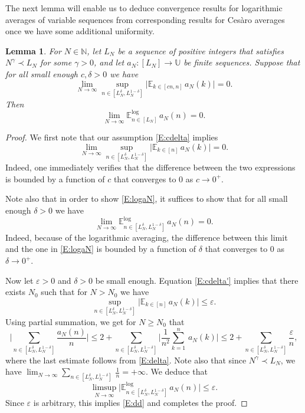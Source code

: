 \documentclass[11pt]{amsart}
\newtheorem{lemma}{Lemma}[section]
\theoremstyle{definition}
\newcommand{\lE}{\mathbb{E}^{\log}}
\newcommand{\E}{{\mathbb E}}
\newcommand{\N}{{\mathbb N}}
\newcommand{\U}{{\mathbb U}}
\begin{document}
 The next lemma will enable us to deduce convergence results for logarithmic averages
 of variable sequences from  corresponding results  for Ces\`aro averages once we have  some additional uniformity.
 \begin{lemma}\label{L:ceslogapp}
For $N\in \N$,  let   $L_N$ be a sequence of positive integers that satisfies  $N^\gamma\prec L_N$ for some $\gamma>0$, and let $a_N\colon [L_N]\to \U$ be  finite sequences.
 	 Suppose that
 	 for all small enough $c,\delta>0$ we have
  	 \begin{equation}\label{E:cdelta}
  	\lim_{N\to\infty} \sup_{n\in [L_N^\delta, L_N^{1-\delta}]}\big| \E_{k\in[cn,n]}\, a_N(k)\big|=0.
  \end{equation}
 	 Then
 	 \begin{equation}\label{E:logaN}
 	 \lim_{N\to\infty} \lE_{n\in[L_N]}\, a_N(n)=0.
 	 \end{equation}
 \end{lemma}
\begin{proof}
	We first note that our assumption  \eqref{E:cdelta}  implies
 \begin{equation}\label{E:cdelta'}
		\lim_{N\to\infty} \sup_{n\in [L_N^\delta, L_N^{1-\delta}]}\big| \E_{k\in[n]}\, a_N(k)\big|=0.
\end{equation}
	Indeed, one immediately verifies that  the difference between the two expressions is
	bounded by  a function of $c$  that  converges to $0$ as $c\to 0^+$.
	
	Note also that in order to show \eqref{E:logaN}, it suffices to show that for all small enough $\delta>0$ we have
	 \begin{equation}\label{E:dd}
	\lim_{N\to\infty} \lE_{n\in[L_N^\delta,L_N^{1-\delta}]}\, a_N(n)=0.
	\end{equation}
	Indeed, because of the logarithmic averaging, the difference between this limit  and the one in \eqref{E:logaN} is bounded by   a function of $\delta$ that converges to $0$ as $\delta\to 0^+$.  
	
	Now let   $ \varepsilon>0$ and $\delta>0$ be small enough. Equation  \eqref{E:cdelta'} implies that there exists $N_0$ such that for $N>N_0$ we have
	 \begin{equation}\label{E:delta}
		\sup_{n\in [L_N^\delta, L_N^{1-\delta}]}\big| \E_{k\in [n]}\, a_N(k)\big|\leq \varepsilon.
	\end{equation}
Using partial summation, we get  for $N\geq N_0$ that
$$
\Big|\sum_{n\in [L_N^\delta,L_N^{1-\delta}]} \frac{a_N(n)}{n} \Big|\leq 2+ \sum_{n\in [L_N^\delta,L_N^{1-\delta}]}\Big| \frac{1}{n^2}\sum_{k=1}^n\, a_N(k)\Big|\leq2+  \sum_{n\in [L_N^\delta,L_N^{1-\delta}]}\frac{\varepsilon}{n},
$$
where the last estimate follows from \eqref{E:delta}.  Note also that since $N^\gamma\prec L_N$, we have $\lim_{N\to\infty}\sum_{n\in [L_N^\delta,L_N^{1-\delta}]}\, \frac{1}{n}=+\infty$. We deduce that
$$
\limsup_{N\to\infty}\big| \lE_{n\in[L_N^\delta,L_N^{1-\delta}]}\, a_N(n)\big|\leq \varepsilon.
$$
Since $\varepsilon$ is arbitrary,
this implies \eqref{E:dd} and completes the proof.
\end{proof}
\end{document}
